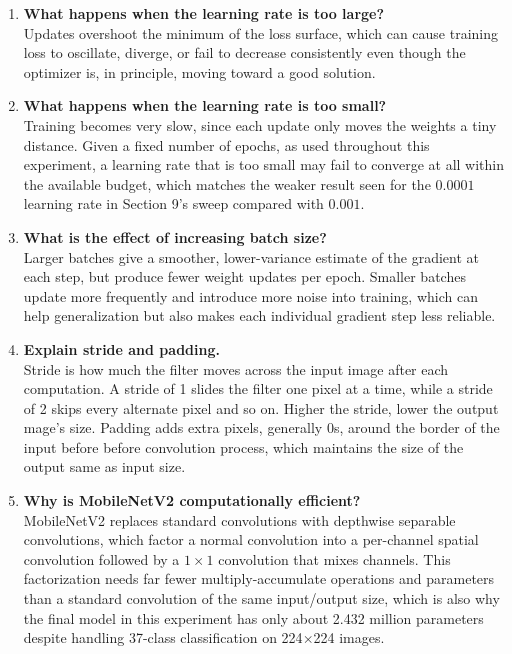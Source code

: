\documentclass[10pt]{article}
\begin{document}
\begin{enumerate}
\item \textbf{What happens when the learning rate is too large?}\\
Updates overshoot the minimum of the loss surface, which can cause
training loss to oscillate, diverge, or fail to decrease consistently
even though the optimizer is, in principle, moving toward a good
solution.\\

\item \textbf{What happens when the learning rate is too small?}\\
Training becomes very slow, since each update only moves the weights a tiny distance. Given a fixed number of epochs, as used throughout this experiment, a learning rate that is too small may fail to converge at all within the available budget, which matches the weaker result seen for the $0.0001$ learning rate in Section 9's sweep compared with $0.001$.\\

\item \textbf{What is the effect of increasing batch size?}\\
Larger batches give a smoother, lower-variance estimate of the gradient at each step, but produce fewer weight updates per epoch. Smaller batches update more frequently and introduce more noise into training, which can help generalization but also makes each individual gradient step less reliable.\\

\item \textbf{Explain stride and padding.}\\
Stride is how much the filter moves across the input image after each computation. A stride of 1 slides the filter one pixel at a
time, while a stride of 2 skips every alternate pixel and so on. Higher the stride, lower the output mage's size. Padding adds extra pixels, generally 0s, around the border of the input before before convolution process, which maintains the size of the output same as input size.\\

\item \textbf{Why is MobileNetV2 computationally efficient?}\\
MobileNetV2 replaces standard convolutions with depthwise separable
convolutions, which factor a normal convolution into a per-channel
spatial convolution followed by a $1\times1$ convolution that mixes channels. This factorization needs far fewer multiply-accumulate operations and parameters than a standard convolution of the same input/output size, which is also why the final model in this experiment has only about 2.432 million parameters despite handling 37-class classification on 224$\times$224 images.\\


\end{enumerate}
\end{document}
